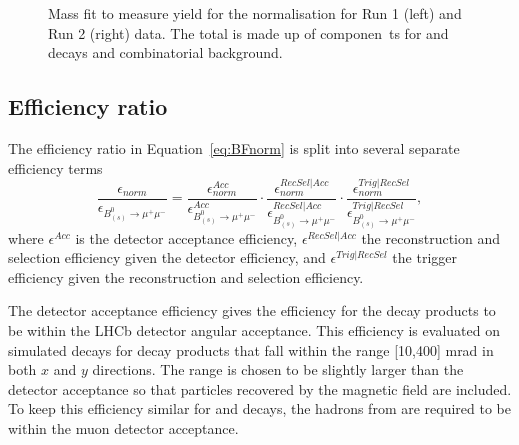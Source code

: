 {{\begin{figure}[htbp]
\begin{subfigure}[b]{0.48\textwidth}
   \end{subfigure}
    \caption{Mass fit to measure \bdkpi yield for the normalisation for Run 1 (left) and Run 2 (right) data. The total \pdf is made up of componen\
ts for \bdkpi and \bskpi decays and combinatorial background.}
    \label{fig:Bdkpiyield}
\end{figure}

\subsection{Efficiency ratio}
\label{sec:effratio}
The efficiency ratio in Equation~\ref{eq:BFnorm} is split into several separate efficiency terms 
\begin{equation}
\frac{\epsilon_{norm}}{\epsilon_{B^{0}_{(s)} \to \mu^{+} \mu^{-}}}  =  \frac{\epsilon^{Acc}_{norm}}{\epsilon^{Acc}_{B^{0}_{(s)} \to \mu^{+} \mu^{-}}} \cdot \frac{\epsilon^{RecSel|Acc}_{norm}}{\epsilon^{RecSel|Acc}_{B^{0}_{(s)} \to \mu^{+} \mu^{-}}} \cdot \frac{\epsilon^{Trig|RecSel}_{norm}}{\epsilon^{Trig|RecSel}_{B^{0}_{(s)} \to \mu^{+} \mu^{-}}},
\label{eq:BFnormDetailed}
\end{equation}
where $\epsilon^{Acc}$ is the detector acceptance efficiency, $\epsilon^{RecSel|Acc}$ the reconstruction and selection efficiency given the detector efficiency, and $\epsilon^{Trig|RecSel}$ the trigger efficiency given the reconstruction and selection efficiency. 

The detector acceptance efficiency gives the efficiency for the decay products to be within the LHCb detector angular acceptance. This efficiency is evaluated on simulated decays for decay products that fall within the range [10,400] mrad in both $x$ and $y$ directions. The range is chosen to be slightly larger than the detector acceptance so that particles recovered by the magnetic field are included. To keep this efficiency similar for \bmumu and \bdkpi decays, the hadrons from \bdkpi are required to be within the muon detector acceptance. 

}}
